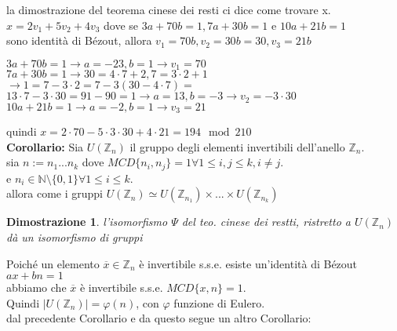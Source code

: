 \documentclass[a4paper,12pt]{article}
\theoremstyle{def}
\theoremstyle{prop}
\theoremstyle{esempio}
\theoremstyle{dimostrazione}
\newtheorem*{dimostrazione}{Dimostrazione}
\theoremstyle{teo}
\theoremstyle{osservazione}
\begin{document}
la dimostrazione del teorema cinese dei resti ci dice come trovare x.\\
\(x = 2 v_1 + 5 v_2 + 4 v_3\) dove se \(3 a + 70 b = 1, 7 a + 30 b = 1\) e \(10 a + 21 b = 1\)\\
sono identità di Bézout, allora \(v_1 = 70 b, v_2 = 30 b  = 30, v_3 = 21 b\)\\
\begin{center}
	\(3 a + 70 b = 1 \rightarrow a = -23, b = 1 \rightarrow v_1 = 70\)\\
	\(7 a + 30 b = 1 \rightarrow 30 = 4 \cdot 7 + 2 , 7 = 3 \cdot 2 + 1\)\\
	\(\rightarrow 1 = 7 - 3 \cdot 2 = 7 - 3(30 - 4 \cdot 7) = \)\\
	\(13 \cdot 7 - 3 \cdot 30 = 91 - 90 = 1 \rightarrow a = 13, b = -3 \rightarrow v_2 = -3 \cdot 30\)\\
	\(10 a + 21 b = 1 \rightarrow a = -2, b = 1 \rightarrow v_3 = 21\)\\
\end{center}

quindi \(x = 2 \cdot 70 - 5 \cdot 3 \cdot 30 + 4 \cdot 21 = 194\mod 210\)\\

\textbf{Corollario:} Sia \(U(\mathbb{Z}_n)\) il gruppo degli elementi invertibili dell'anello \(\mathbb{Z}_n\).\\
sia \(n := n_1 ... n_k\) dove \(MCD\{n_i, n_j\} = 1 \forall 1 \leq i,j \leq k, i \neq j\).\\
e \(n_i \in \mathbb{N} \setminus \{0,1\} \forall 1 \leq i \leq k\).\\
allora come i gruppi \(U(\mathbb{Z}_n) \simeq U(\mathbb{Z}_{n_1}) \times ... \times U(\mathbb{Z}_{n_k})\)

\begin{dimostrazione}
	l'isomorfismo \(\Psi\) del teo. cinese dei restti, ristretto a \(U(\mathbb{Z}_n)\) dà un isomorfismo di gruppi\\
\end{dimostrazione}

Poiché un elemento \(\overline{x} \in \mathbb{Z}_n\) è invertibile s.s.e. esiste un'identità di Bézout \(ax + bn = 1\)\\
abbiamo che \(\overline{x}\) è invertibile s.s.e. \(MCD\{x,n\} = 1\).\\
Quindi \(|U(\mathbb{Z}_n)| = \varphi(n)\), con \(\varphi\) funzione di Eulero.\\

dal precedente Corollario e da questo segue un altro Corollario:
\end{document}
